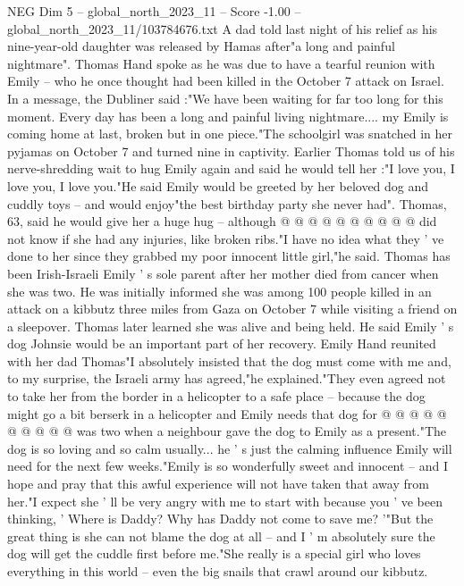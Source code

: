 \begin{textsample}{NEG Dim 5 – global\_north\_2023\_11 – Score -1.00 – global\_north\_2023\_11/103784676.txt}  \label{ex:f5_neg_044}
A dad told last night of his relief as his nine-year-old daughter was released by Hamas after"a long and painful nightmare".
Thomas Hand spoke as he was due to have a tearful reunion with Emily -- who he once thought had been killed in the October 7 attack on Israel.
In a message, the Dubliner said :"We have been waiting for far too long for this moment.
Every day has been a long and painful living nightmare.... my Emily is coming home at last, broken but in one piece."The schoolgirl was snatched in her pyjamas on October 7 and turned nine in captivity.
Earlier Thomas told us of his nerve-shredding wait to hug Emily again and said he would tell her :"I love you, I love you, I love you."He said Emily would be greeted by her beloved dog and cuddly toys -- and would enjoy"the best birthday party she never had".
Thomas, 63, said he would give her a huge hug -- although @ @ @ @ @ @ @ @ @ @ did not know if she had any injuries, like broken ribs."I have no idea what they ' ve done to her since they grabbed my poor innocent little girl,"he said.
Thomas has been Irish-Israeli Emily ' s sole parent after her mother died from cancer when she was two.
He was initially informed she was among 100 people killed in an attack on a kibbutz three miles from Gaza on October 7 while visiting a friend on a sleepover.
Thomas later learned she was alive and being held.
He said Emily ' s dog Johnsie would be an important part of her recovery.
Emily Hand reunited with her dad Thomas"I absolutely insisted that the dog must come with me and, to my surprise, the Israeli army has agreed,"he explained."They even agreed not to take her from the border in a helicopter to a safe place -- because the dog might go a bit berserk in a helicopter and Emily needs that dog for @ @ @ @ @ @ @ @ @ @ was two when a neighbour gave the dog to Emily as a present."The dog is so loving and so calm usually... he ' s just the calming influence Emily will need for the next few weeks."Emily is so wonderfully sweet and innocent -- and I hope and pray that this awful experience will not have taken that away from her."I expect she ' ll be very angry with me to start with because you ' ve been thinking, ' Where is Daddy?
Why has Daddy not come to save me? '"But the great thing is she can not blame the dog at all -- and I ' m absolutely sure the dog will get the cuddle first before me."She really is a special girl who loves everything in this world -- even the big snails that crawl around our kibbutz.

\end{textsample}
